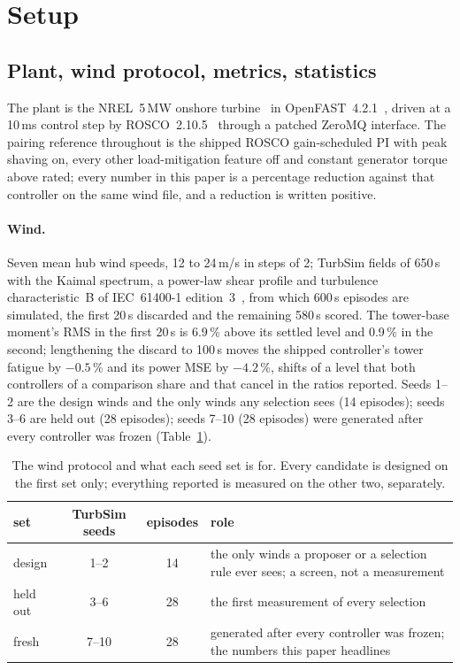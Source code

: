 \documentclass{article}
\begin{document}
\section{Setup}
\label{sec:setup}

\subsection{Plant, wind protocol, metrics, statistics}
\label{sec:protocol}
The plant is the NREL~5\,MW onshore turbine~\citep{Jonkman2009nrel5mw} in OpenFAST~4.2.1~\citep{OpenFAST}, driven at a 10\,ms control step by ROSCO~2.10.5~\citep{Abbas2022rosco} through a patched ZeroMQ interface. The pairing reference throughout is the shipped ROSCO gain-scheduled PI with peak shaving on, every other load-mitigation feature off and constant generator torque above rated; every number in this paper is a percentage reduction against that controller on the same wind file, and a reduction is written positive.

\paragraph{Wind.} Seven mean hub wind speeds, 12 to 24\,m/s in steps of 2; TurbSim fields of 650\,s with the Kaimal spectrum, a power-law shear profile and turbulence characteristic~B of IEC~61400-1 edition~3~\citep{IEC61400}, from which 600\,s episodes are simulated, the first 20\,s discarded and the remaining 580\,s scored. The tower-base moment's RMS in the first 20\,s is 6.9\,\% above its settled level and 0.9\,\% in the second; lengthening the discard to 100\,s moves the shipped controller's tower fatigue by $-0.5$\,\% and its power MSE by $-4.2$\,\%, shifts of a level that both controllers of a comparison share and that cancel in the ratios reported. Seeds 1--2 are the design winds and the only winds any selection sees (14 episodes); seeds 3--6 are held out (28 episodes); seeds 7--10 (28 episodes) were generated after every controller was frozen (Table~\ref{tab:protocol}).

\begin{table}[t]
\centering\small
\caption{The wind protocol and what each seed set is for. Every candidate is designed on the first set only; everything reported is measured on the other two, separately.}
\label{tab:protocol}
\begin{tabular}{lccl}
\toprule
set & TurbSim seeds & episodes & role \\
\midrule
design   & 1--2  & 14 & the only winds a proposer or a selection rule ever sees; a screen, not a measurement \\
held out & 3--6  & 28 & the first measurement of every selection \\
fresh    & 7--10 & 28 & generated after every controller was frozen; the numbers this paper headlines \\
\bottomrule
\end{tabular}
\end{table}
\end{document}
